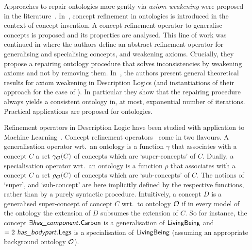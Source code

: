 \documentclass[
]{ceurart}
\begin{document}
Approaches to repair ontologies more gently via {\em axiom weakening} were proposed in the literature~\cite{du2014practical,AMAI-2018,troquard2018repairing,DBLP:conf/kr/BaaderKNP18}. 
In~\cite{AMAI-2018}, concept refinement in \elpp ontologies is introduced in the context of concept invention. A concept refinement operator to generalise  \elpp concepts is proposed and its properties are analysed. This line of work was continued in \cite{troquard2018repairing} where the authors define an abstract refinement operator for generalising and specialising \ALC concepts, and weakening \ALC axioms. Crucially, they propose a repairing ontology procedure that solves inconsistencies by weakening axioms and not by removing them. In~\cite{DBLP:conf/kr/BaaderKNP18}, the authors present general theoretical results for axiom weakening in Description Logics (and instantiations of their approach for the case of \EL). In particular they show that the repairing procedure always yields a consistent ontology in, at most,  exponential number of iterations. Practical applications are proposed for \EL ontologies. 

Refinement operators in Description Logic have been studied with application to Machine Learning~\cite{DBLP:conf/ilp/BadeaN00,DBLP:conf/ilp/LehmannH07,DBLP:conf/ilp/LehmannH07a,LeHi10}. Concept refinement operators~\cite{laag98} come in two flavours.
%
A generalisation operator wrt.\ an ontology \Ontology is a function $\gamma$ that associates with a concept $C$  a set $\gamma_\mathcal{O}(C)$ of concepts which are `super-concepts' of $C$.
%
Dually, a specialisation operator wrt.\ an ontology \Ontology is a function $\rho$ that associates with a concept $C$ a set $\rho_\mathcal{O}(C)$ of concepts which are `sub-concepts' of $C$.  
%
The notions of `super', and `sub-concept' are here implicitly defined by the respective functions, rather than by a purely syntactic procedure. Intuitively, a concept $D$ is a generalised super-concept of concept $C$ wrt.\ to ontology $\mathcal{O}$ if in every model of the ontology the extension of $D$ subsumes the extension of $C$. So for instance, the concept $\exists \textsf{\textsl{has\_component}} . \textsf{Carbon}$ is a generalisation of $\textsf{LivingBeing}$ and $= 2~\textsf{\textsl{has\_bodypart}} . \textsf{Legs}$ is a specialisation of  $\textsf{LivingBeing}$ (assuming an appropriate background ontology $\mathcal{O}$).  
\end{document}
